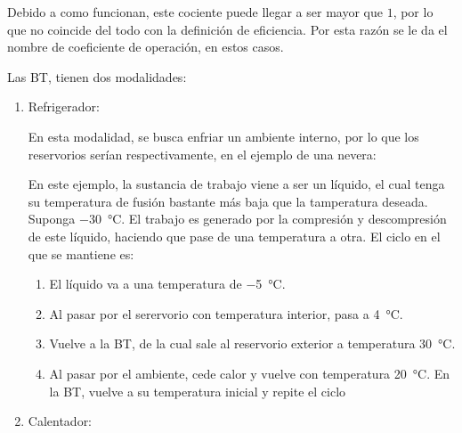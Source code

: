 Debido a como funcionan, este cociente puede llegar a ser mayor que $1$,
por lo que no coincide del todo con la definición de eficiencia. Por esta
razón se le da el nombre de coeficiente de operación, en estos casos.

Las BT, tienen dos modalidades:
\begin{enumerate}
  \item Refrigerador:

        En esta modalidad, se busca enfriar un ambiente interno, por lo que
        los reservorios serían respectivamente, en el ejemplo de una nevera:

        \begin{center}
        \end{center}

        En este ejemplo, la sustancia de trabajo viene a ser un líquido,
        el cual tenga su temperatura de fusión bastante más baja que la
        tamperatura deseada. Suponga \qty{-30}{\degreeCelsius}. El
        trabajo es generado por la compresión y descompresión de este
        líquido, haciendo que pase de una temperatura a otra. El ciclo
        en el que se mantiene es:
        \begin{enumerate}
          \item El líquido va a una temperatura de \qty{-5}{\degreeCelsius}.
          \item Al pasar por el serervorio con temperatura interior, pasa a
                \qty{4}{\degreeCelsius}.
          \item Vuelve a la BT, de la cual sale al reservorio exterior a
                temperatura \qty{30}{\degreeCelsius}.
          \item Al pasar por el ambiente, cede calor y vuelve con temperatura
                \qty{20}{\degreeCelsius}. En la BT, vuelve a su temperatura
                inicial y repite el ciclo
        \end{enumerate}
  \item Calentador:
        

\end{enumerate}
